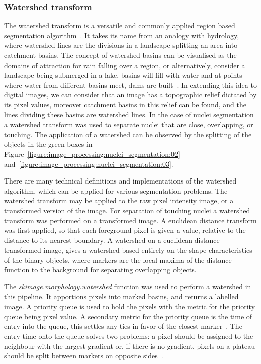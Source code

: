 \subsubsection{Watershed transform}
The watershed transform is a versatile and commonly applied region based segmentation algorithm~\cite{Vincent1991}. It takes its name from an analogy with hydrology, where watershed lines are the divisions in a landscape splitting an area into catchment basins. The concept of watershed basins can be visualised as the domains of attraction for rain falling over a region, or alternatively, consider a landscape being submerged in a lake, basins will fill with water and at points where water from different basins meet, dams are built~\cite{Roerdink2000}. In extending this idea to digital images, we can consider that an image has a topographic relief dictated by its pixel values, moreover catchment basins in this relief can be found, and the lines dividing these basins are watershed lines. In the case of nuclei segmentation a watershed transform was used to separate nuclei that are close, overlapping, or touching. The application of a watershed can be observed by the splitting of the objects in the green boxes in Figure~\ref{figure:image_processing:nuclei_segmentation:02} and~\ref{figure:image_processing:nuclei_segmentation:03}.

There are many technical definitions and implementations of the watershed algorithm, which can be applied for various segmentation problems. The watershed transform may be applied to the raw pixel intensity image, or a transformed version of the image. For separation of touching nuclei a watershed transform was performed on a transformed image. A euclidean distance transform was first applied, so that each foreground pixel is given a value, relative to the distance to its nearest boundary. A watershed on a euclidean distance transformed image, gives a watershed based entirely on the shape characteristics of the binary objects, where markers are the local maxima of the distance function to the background for separating overlapping objects.

The \emph{skimage.morphology.watershed} function was used to perform a watershed in this pipeline. It apportions pixels into marked basins, and returns a labelled image. A priority queue is used to hold the pixels with the metric for the priority queue being pixel value. A secondary metric for the priority queue is the time of entry into the queue, this settles any ties in favor of the closest marker~\cite{scikit-image}. The entry time onto the queue solves two problems: a pixel should be assigned to the neighbour with the largest gradient or, if there is no gradient, pixels on a plateau should be split between markers on opposite sides~\cite{Soille1990}.


